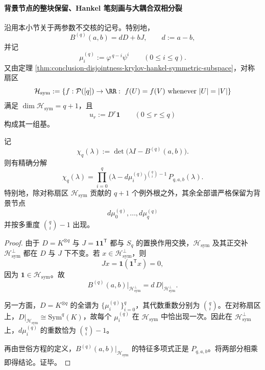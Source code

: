 \paragraph{背景节点的整块保留、Hankel 笔刻画与大耦合双相分裂}
沿用本小节关于两参数不交核的记号。特别地，
\[
B^{(q)}(a,b)=dD+bJ,\qquad d:=a-b,
\]
并记
\[
\mu_i^{(q)}:=\varphi^{\,q-i}\psi^i\qquad(0\le i\le q).
\]
又由定理 \ref{thm:conclusion-disjointness-krylov-hankel-symmetric-subspace}，对称扇区
\[
\mathcal H_{\mathrm{sym}}
:=
\{f:\mathcal P([q])\to \RR:\ f(U)=f(V)\ \text{whenever }|U|=|V|\}
\]
满足 \(\dim \mathcal H_{\mathrm{sym}}=q+1\)，且
\[
u_r:=D^r\mathbf 1\qquad(0\le r\le q)
\]
构成其一组基。

\begin{theorem}\label{thm:conclusion-disjointness-full-characteristic-polynomial-splitting}
记
\[
\chi_q(\lambda):=\det\!\bigl(\lambda I-B^{(q)}(a,b)\bigr).
\]
则有精确分解
\[
\chi_q(\lambda)
=
\prod_{i=0}^{q}\bigl(\lambda-d\mu_i^{(q)}\bigr)^{\binom qi-1}\,
P_{q,a,b}(\lambda).
\]
特别地，除对称扇区 \(\mathcal H_{\mathrm{sym}}\) 贡献的 \(q+1\) 个例外根之外，其余全部谱严格保留为背景节点
\[
d\mu_0^{(q)},\dots,d\mu_q^{(q)}
\]
并按多重度 \(\binom qi-1\) 出现。
\end{theorem}
\begin{proof}
由于 \(D=K^{\otimes q}\) 与 \(J=\mathbf 1\mathbf 1^{\mathsf T}\) 都与 \(S_q\) 的置换作用交换，\(\mathcal H_{\mathrm{sym}}\) 及其正交补 \(\mathcal H_{\mathrm{sym}}^\perp\) 都在 \(D\) 与 \(J\) 下不变。若 \(x\in \mathcal H_{\mathrm{sym}}^\perp\)，则
\[
Jx=\mathbf 1(\mathbf 1^{\mathsf T}x)=0,
\]
因为 \(\mathbf 1\in \mathcal H_{\mathrm{sym}}\)。故
\[
B^{(q)}(a,b)\big|_{\mathcal H_{\mathrm{sym}}^\perp}
=
d\,D\big|_{\mathcal H_{\mathrm{sym}}^\perp}.
\]

另一方面，\(D=K^{\otimes q}\) 的全谱为 \(\{\mu_i^{(q)}\}_{i=0}^{q}\)，其代数重数分别为 \(\binom qi\)。在对称扇区上，\(D\big|_{\mathcal H_{\mathrm{sym}}}\cong \mathrm{Sym}^q(K)\)，故每个 \(\mu_i^{(q)}\) 在 \(\mathcal H_{\mathrm{sym}}\) 中恰出现一次。因此在 \(\mathcal H_{\mathrm{sym}}^\perp\) 上，\(d\mu_i^{(q)}\) 的重数恰为 \(\binom qi-1\)。

再由世俗方程的定义，\(B^{(q)}(a,b)\big|_{\mathcal H_{\mathrm{sym}}}\) 的特征多项式正是 \(P_{q,a,b}\)。将两部分相乘即得结论。证毕。
\end{proof}

